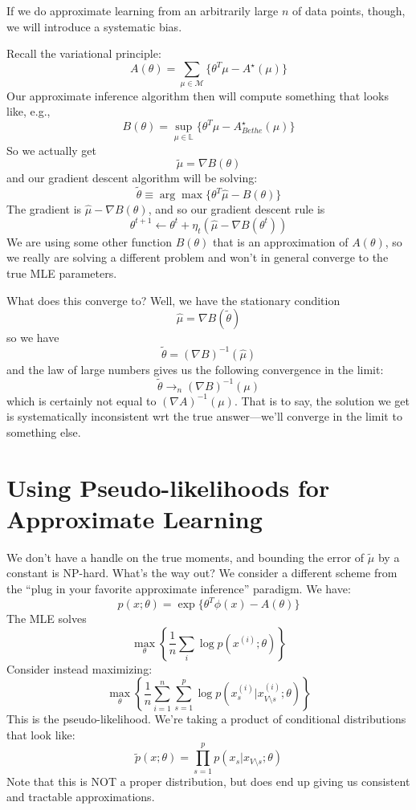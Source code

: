 \documentclass{article}
\newcommand{\M}{\mathcal{M}}
\newcommand{\inv}{^{-1}}
\begin{document}
If we do approximate learning from an arbitrarily large $n$ of data points, though, we will introduce a systematic bias.

Recall the variational principle:
$$
A(\theta) = \sum_{\mu\in\M} \{
	\theta^T\mu - A^\star(\mu)
\}
$$
Our approximate inference algorithm then will compute something that looks like, e.g.,
$$
B(\theta) = 
\sup_{\mu\in\mathbb L}
\{
	\theta^T \mu - A^\star_{Bethe}(\mu)
\}
$$
So we actually get
$$
\tilde \mu = \nabla B(\theta)
$$
and our gradient descent algorithm will be solving:
$$
\tilde\theta \equiv
\arg\max\{
	\theta^T\hat\mu - B(\theta)
\}
$$
The gradient is $\hat\mu - \nabla B(\theta)$, and so our gradient descent rule is
$$
\theta^{t+1}
\leftarrow
\theta^t + \eta_t (\hat\mu - \nabla B(\theta^t))
$$
We are using some other function $B(\theta)$ that is an approximation of $A(\theta)$, so we
really are solving a different problem and won't in general converge to the true MLE parameters.

What does this converge to?
Well, we have the stationary condition
$$
\hat\mu = \nabla B(\tilde\theta)
$$
so we have
$$
\tilde\theta = (\nabla B)\inv (\hat\mu)
$$
and the law of large numbers gives us the following convergence in the limit:
$$
\tilde\theta \rightarrow_n
(\nabla B)\inv (\mu)
$$
which is certainly not equal to $(\nabla A)\inv (\mu)$.
That is to say, the solution we get is systematically inconsistent wrt the true answer---we'll converge in the limit to something else.




\section{Using Pseudo-likelihoods for Approximate Learning}



We don't have a handle on the true moments, and bounding the error of $\tilde\mu$ by a constant is NP-hard.
What's the way out? 
We consider a different scheme from the ``plug in your favorite approximate inference'' paradigm.
We have:
$$
p(x;\theta) = \exp\{
	\theta^T \phi(x) - A(\theta)
\}
$$
The MLE solves
$$
\max_\theta
\left\{
\frac{1}{n}
\sum_i
\log p(x^{(i)}; \theta)
\right\}
$$
Consider instead maximizing:
$$
\max_\theta
\left\{
	\frac{1}{n}
	\sum_{i=1}^n
	\sum_{s=1}^p
	\log
	p(x_s^{(i)} | x^{(i)}_{V\setminus s} ; \theta)
\right\}
$$
This is the pseudo-likelihood.
We're taking a product of conditional distributions that look like:
$$
\tilde p(x; \theta)
=
\prod_{s=1}^p
p(x_s | x_{V\setminus s}; \theta)
$$
Note that this is NOT a proper distribution, but does end up giving us consistent and tractable approximations.
\end{document}
